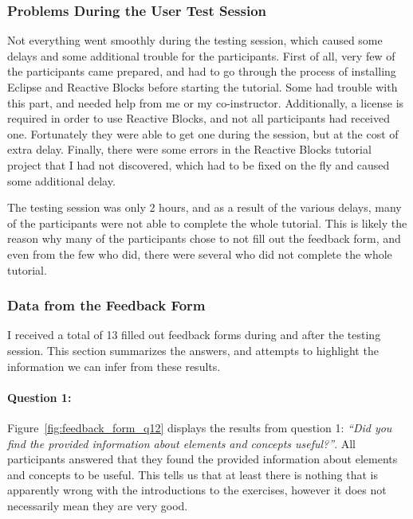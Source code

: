 \subsubsection{Problems During the User Test Session}
Not everything went smoothly during the testing session, which caused some delays and some additional trouble for the participants. First of all, very few of the participants came prepared, and had to go through the process of installing Eclipse and Reactive Blocks before starting the tutorial. Some had trouble with this part, and needed help from me or my co-instructor. Additionally, a license is required in order to use Reactive Blocks, and not all participants had received one. Fortunately they were able to get one during the session, but at the cost of extra delay. Finally, there were some errors in the Reactive Blocks tutorial project that I had not discovered, which had to be fixed on the fly and caused some additional delay.

\noindent
The testing session was only 2 hours, and as a result of the various delays, many of the participants were not able to complete the whole tutorial. This is likely the reason why many of the participants chose to not fill out the feedback form, and even from the few who did, there were several who did not complete the whole tutorial.

\subsubsection{Data from the Feedback Form}
I received a total of 13 filled out feedback forms during and after the testing session. This section summarizes the answers, and attempts to highlight the information we can infer from these results.

\paragraph{Question 1:} Figure~\ref{fig:feedback_form_q12} displays the results from question 1: \emph{``Did you find the provided information about elements and concepts useful?''}. All participants answered that they found the provided information about elements and concepts to be useful. This tells us that at least there is nothing that is apparently wrong with the introductions to the exercises, however it does not necessarily mean they are very good.

